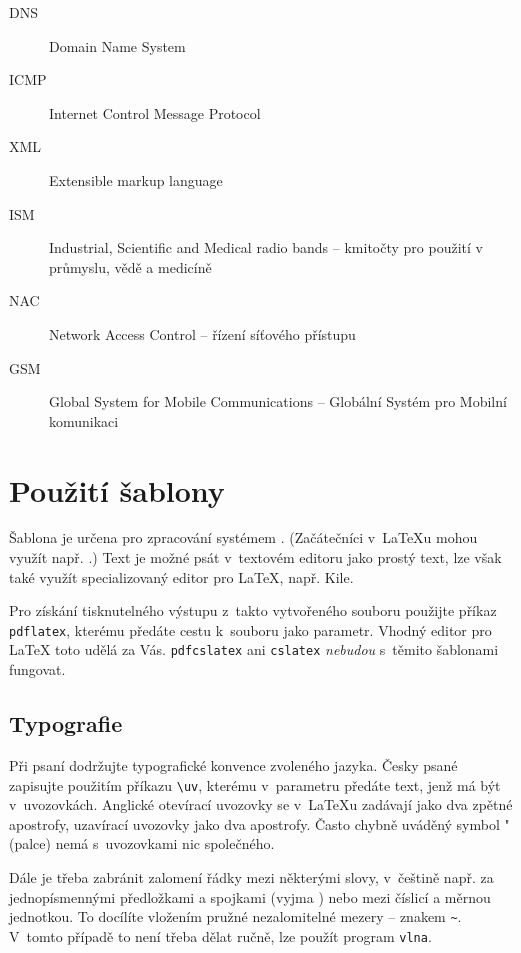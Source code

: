 \documentclass[thesis=M,czech]{FITthesis}[2012/10/20]
\begin{document}
\begin{description}
	\item[DNS] Domain Name System
	\item[ICMP] Internet Control Message Protocol
	\item[XML] Extensible markup language
	\item[ISM] Industrial, Scientific and Medical radio bands -- kmitočty pro použití v průmyslu, vědě a medicíně
	\item[NAC] Network Access Control -- řízení síťového přístupu
	\item[GSM] Global System for Mobile Communications -- Globální Systém pro Mobilní komunikaci
\end{description}




\section{Použití šablony}

Šablona je určena pro zpracování systémem \LaTeXe{}. (Začátečníci v~\LaTeX{}u mohou využít např. \cite{rybicka}.) Text je možné psát v~textovém editoru jako prostý text, lze však také využít specializovaný editor pro \LaTeX{}, např. Kile.

Pro získání tisknutelného výstupu z~takto vytvořeného souboru použijte příkaz \verb|pdflatex|, kterému předáte cestu k~souboru jako parametr. Vhodný editor pro \LaTeX{} toto udělá za Vás. \verb|pdfcslatex| ani \verb|cslatex| \emph{nebudou} s~těmito šablonami fungovat.

\subsection{Typografie}

Při psaní dodržujte typografické konvence zvoleného jazyka. Česky psané  zapisujte použitím příkazu \verb|\uv|, kterému v~parametru předáte text, jenž má být v~uvozovkách. Anglické otevírací uvozovky se v~\LaTeX{}u zadávají jako dva zpětné apostrofy, uzavírací uvozovky jako dva apostrofy. Často chybně uváděný symbol "{} (palce) nemá s~uvozovkami nic společného.

Dále je třeba zabránit zalomení řádky mezi některými slovy, v~češtině např. za jednopísmennými předložkami a spojkami (vyjma ) nebo mezi číslicí a měrnou jednotkou. To docílíte vložením pružné nezalomitelné mezery -- znakem \texttt{\textasciitilde}. V~tomto případě to není třeba dělat ručně, lze použít program \verb|vlna|.
\end{document}

